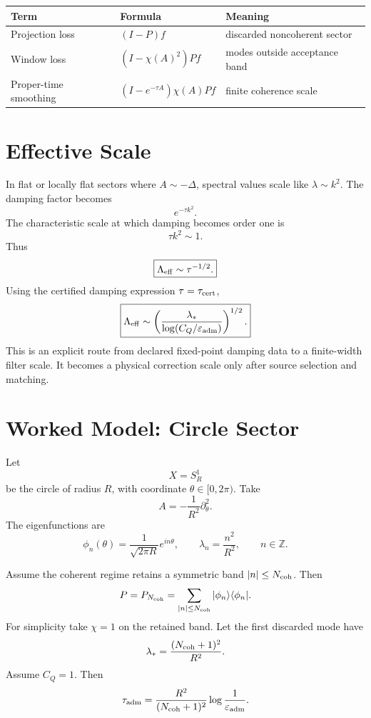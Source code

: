 \documentclass[11pt]{article}
\begin{document}
\begin{center}
\begin{tabular}{lll}
\hline
Term & Formula & Meaning\\
\hline
Projection loss & \((I-P)f\) & discarded noncoherent sector\\
Window loss & \((I-\chi(A)^2)Pf\) & modes outside acceptance band\\
Proper-time smoothing & \((I-e^{-\tau A})\chi(A)Pf\) & finite coherence scale\\
\hline
\end{tabular}
\end{center}

\section{Effective Scale}

In flat or locally flat sectors where \(A\sim -\Delta\), spectral values scale like \(\lambda\sim k^2\). The damping factor becomes
\[
e^{-\tau k^2}.
\]
The characteristic scale at which damping becomes order one is
\[
\tau k^2\sim1.
\]
Thus
\[
\boxed{
\Lambda_{\rm eff}\sim \tau^{-1/2}.
}
\]
Using the certified damping expression \(\tau=\tau_{\rm cert}\),
\[
\boxed{
\Lambda_{\rm eff}
\sim
\left(
\frac{\lambda_\ast}{\log(C_Q/\varepsilon_{\rm adm})}
\right)^{1/2}.
}
\]
This is an explicit route from declared fixed-point damping data to a finite-width filter
scale. It becomes a physical correction scale only after source selection and matching.

\section{Worked Model: Circle Sector}

Let
\[
X=S^1_R
\]
be the circle of radius \(R\), with coordinate \(\theta\in[0,2\pi)\). Take
\[
A=-\frac{1}{R^2}\partial_\theta^2.
\]
The eigenfunctions are
\[
\phi_n(\theta)=\frac{1}{\sqrt{2\pi R}}e^{in\theta},
\qquad
\lambda_n=\frac{n^2}{R^2},
\qquad n\in\mathbb Z.
\]

Assume the coherent regime retains a symmetric band \(|n|\le N_{\rm coh}\). Then
\[
P=P_{N_{\rm coh}}
=
\sum_{|n|\le N_{\rm coh}}|\phi_n\rangle\langle\phi_n|.
\]
For simplicity take \(\chi=1\) on the retained band. Let the first discarded mode have
\[
\lambda_\ast=\frac{(N_{\rm coh}+1)^2}{R^2}.
\]
Assume \(C_Q=1\). Then
\[
\tau_{\rm adm}
=
\frac{R^2}{(N_{\rm coh}+1)^2}
\log\frac{1}{\varepsilon_{\rm adm}}.
\]
\end{document}
